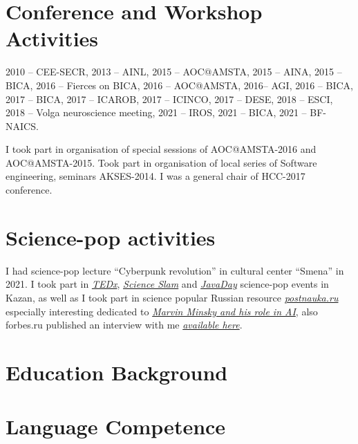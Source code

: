\documentclass{moderncv}
\begin{document}
 

\cvitem{}{}

\section{Conference and Workshop Activities}

2010 -- CEE-SECR, 2013 -- AINL, 2015 -- AOC@AMSTA, 2015 -- AINA, 2015 -- BICA, 2016 -- Fierces on BICA, 2016 -- AOC@AMSTA, 2016-- AGI, 2016 -- BICA, 2017 -- BICA, 2017 -- ICAROB, 2017 -- ICINCO, 2017 -- DESE, 2018 -- ESCI, 2018 -- Volga neuroscience meeting, 2021 -- IROS, 2021 -- BICA, 2021 -- BF-NAICS. 

I took part in organisation of special sessions of AOC@AMSTA-2016 and AOC@AMSTA-2015. Took part in organisation of local series of Software engineering, seminars AKSES-2014. I was a general chair of HCC-2017 conference.

\section{Science-pop activities}
I had science-pop lecture ``Cyberpunk revolution'' in cultural center ``Smena'' in 2021.
I took part in \href{https://www.youtube.com/watch?v=BLvS7h3kRbo}{\emph{TEDx}}, \href{https://vk.com/video-87488544_171504962}{\emph{Science Slam}} and \href{https://www.youtube.com/watch?v=sLLKxvUEA7E}{\emph{JavaDay}} science-pop events in Kazan, as well as I took part in science popular Russian resource \href{https://postnauka.ru/author/talanov}{\emph{postnauka.ru}} especially interesting dedicated to \href{https://postnauka.ru/faq/58727}{\emph{Marvin Minsky and his role in AI}}, also forbes.ru published an interview with me \href{http://www.forbes.ru/mneniya-column/288097-kak-sozdat-emotsionalnyi-iskusstvennyi-intellekt}{\emph{available here}}.

\section{Education Background}


\section{Language Competence}
\end{document}
